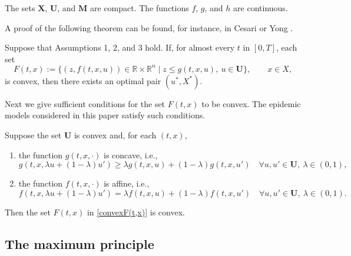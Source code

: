 \begin{assumption} The sets $\mathbf{X}$,  $\mathbf{U}$, and $\mathbf{M}$ are compact. The functions $f$, $g$, and $h$ are continuous.
\end{assumption}
A proof of the following theorem can be found, for instance, in Cesari \cite[Sect. 9.3.]{Cesari83} or Yong \cite[Theorem 2.2.1]{Yong2015}. 
\begin{theorem}[Filippov] Suppose that Assumptions 1, 2, and 3 hold. If, for almost every $t$ in $[0,T]$, each set
        \begin{equation}\label{convexF(t,x)}
F(t,x):= \{ (z, f(t,x,u))\in \mathbb{R}\times \mathbb{R}^n\mid  
    z \leq g(t,x,u), \  u\in \mathbf{U}\},\qquad x\in X,
        \end{equation}
is convex, then there exists an optimal pair $(u^\ast,X^\ast)$.
\end{theorem} 
Next we give sufficient conditions for the set $F(t,x)$ to be convex. The epidemic models considered in this paper satisfy such conditions.

\begin{remark} Suppose the set $\mathbf{U}$ is convex and, for each $(t,x)$, 
\begin{enumerate}[\rm (a)]
    \item the function $g(t,x,\cdot)$ is concave, i.e.,
        \[ g(t,x,\lambda u+(1-\lambda)u') \geq \lambda g(t,x,u) +(1-\lambda) g(t,x,u') \quad \forall u,u'\in\mathbf{U},\  \lambda\in (0,1), \]
       
    \item the function $f(t,x,\cdot)$ is affine, i.e., 
      \[ f(t,x,\lambda u+(1-\lambda)u') = \lambda f(t,x,u) +(1-\lambda) f(t,x,u') \quad \forall  u,u'\in\mathbf{U},\   \lambda\in (0,1). \]
\end{enumerate} 
Then the set $F(t,x)$ in \eqref{convexF(t,x)} is convex.
\end{remark}








\subsection{The maximum principle}



